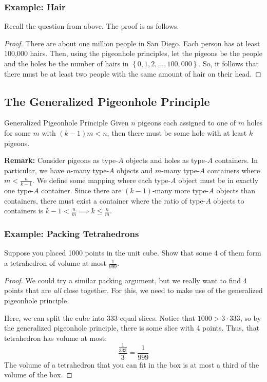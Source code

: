 \documentclass[letterpaper]{article}
\begin{document}
\subsubsection{Example: Hair}
Recall the question from above. The proof is as follows.
\begin{proof}
    There are about one million people in San Diego. Each person has at least 100,000 hairs. Then, using the pigeonhole principles, let the pigeons be the people and the holes be the number of hairs in $\left\{0, 1, 2, ..., 100,000\right\}$. So, it follows that there must be at least two people with the same amount of hair on their head.
\end{proof}


\subsection{The Generalized Pigeonhole Principle}
\begin{theorem}{Generalized Pigeonhole Principle}{}
    Given $n$ pigeons each assigned to one of $m$ holes for some $m$ with $(k - 1)m < n$, then there must be some hole with at least $k$ pigeons. 
\end{theorem}
\textbf{Remark:} Consider pigeons as type-$A$ objects and holes as type-$A$ containers. In particular, we have $n$-many type-$A$ objects and $m$-many type-$A$ containers where $m < \frac{n}{k - 1}$. We define some mapping where each type-$A$ object must be in exactly one type-$A$ container. Since there are $(k - 1)$-many more type-$A$ objects than containers, there must exist a container where the ratio of type-$A$ objects to containers is $k - 1 < \frac{n}{m} \implies k \leq \frac{n}{m}$. 

\subsubsection{Example: Packing Tetrahedrons}
Suppose you placed 1000 points in the unit cube. Show that some 4 of them form a tetrahedron of volume at most $\frac{1}{999}$.

\begin{proof}
    We could try a similar packing argument, but we really want to find 4 points that are \emph{all} close together. For this, we need to make use of the generalized pigeonhole principle.

    \bigskip 

    Here, we can split the cube into 333 equal slices. Notice that $1000 > 3 \cdot 333$, so by the generalized pigeonhole principle, there is some slice with 4 points. Thus, that tetrahedron has volume at most:
    \[\frac{\frac{1}{333}}{3} = \frac{1}{999}\]
    The volume of a tetrahedron that you can fit in the box is at most a third of the volume of the box. 
\end{proof}
\end{document}

